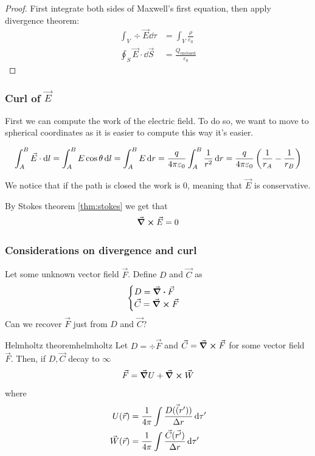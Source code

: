 \documentclass[12pt]{extarticle}
\begin{document}
\begin{proof}
	First integrate both sides of Maxwell's first equation, then apply divergence theorem:
	\begin{align}
		\int_V \div \vec E \dd{\tau}     & = \int_V \frac{\rho}{\varepsilon_0}       \\
		\oint_S \vec E \cdot \dd{\vec S} & = \frac{Q_\text{enclosed}}{\varepsilon_0}
	\end{align}
\end{proof}

\subsubsection{Curl of \texorpdfstring{$\vec E$}{the electric field}}
\label{sec:curl-electric}

First we can compute the work of the electric field.
To do so, we want to move to spherical coordinates as it is easier to compute this way it's easier.

\begin{equation}
	\label{eq:potential-electric-point}
	\int_A^B \vec E \cdot \dd{l} = \int_A^B E \cos \theta \dd{l} = \int_A^B E \dd{r} = \frac{q}{4 \pi \varepsilon_0} \int_A^B \frac{1}{r^2} \dd{r} = \frac{q}{4 \pi \varepsilon_0} \left(\frac{1}{r_A} - \frac{1}{r_B}\right)
\end{equation}

We notice that if the path is closed the work is $0$, meaning that $\vec E$ is conservative.

By Stokes theorem \cref{thm:stokes} we get that
\begin{equation}
	\curl \vec E = 0
\end{equation}

\subsubsection{Considerations on divergence and curl}

Let some unknown vector field $\vec F$. Define $D$ and $\vec C$ as
\begin{equation}
	\begin{cases}
		D = \div \vec F \\
		\vec C = \curl \vec F
	\end{cases}
\end{equation}
Can we recover $\vec F$ just from $D$ and $\vec C$?

\begin{theorem}{Helmholtz theorem}{helmholtz}
	Let $D = \div \vec F$ and $\vec C = \curl \vec F$ for some vector field $\vec F$.
	Then, if $D, \vec C$ decay to $\infty$ 
	\begin{equation}
		\vec F = \grad U + \curl \vec W
	\end{equation}
	where
	\begin{align}
		U(\vec r)       & = \frac{1}{4 \pi} \int \frac{D(\vec(r'))}{\Delta r} \dd{\tau'} \label{eq:helmholtz_1}      \\
		\vec W (\vec r) & = \frac{1}{4 \pi} \int\frac{\vec C(\vec {r'})}{\Delta r} \dd{\tau'} \label{eq:helmholtz_2}
	\end{align}
\end{theorem}
\end{document}

